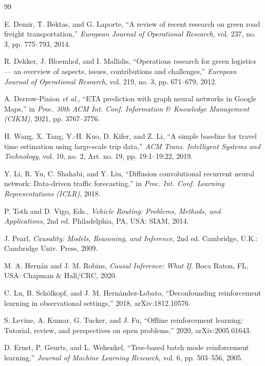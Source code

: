 \documentclass[a4paper,conference]{IEEEtran}
\begin{document}
\begin{thebibliography}{99}

 E. Demir, T. Bektas, and G. Laporte, ``A review of recent research on green road freight transportation,'' \emph{European Journal of Operational Research}, vol. 237, no. 3, pp. 775--793, 2014.

 R. Dekker, J. Bloemhof, and I. Mallidis, ``Operations research for green logistics --- an overview of aspects, issues, contributions and challenges,'' \emph{European Journal of Operational Research}, vol. 219, no. 3, pp. 671--679, 2012.

 A. Derrow-Pinion \emph{et al.}, ``ETA prediction with graph neural networks in Google Maps,'' in \emph{Proc. 30th ACM Int. Conf. Information \& Knowledge Management (CIKM)}, 2021, pp. 3767--3776.

 H. Wang, X. Tang, Y.-H. Kuo, D. Kifer, and Z. Li, ``A simple baseline for travel time estimation using large-scale trip data,'' \emph{ACM Trans. Intelligent Systems and Technology}, vol. 10, no. 2, Art. no. 19, pp. 19:1--19:22, 2019.

 Y. Li, R. Yu, C. Shahabi, and Y. Liu, ``Diffusion convolutional recurrent neural network: Data-driven traffic forecasting,'' in \emph{Proc. Int. Conf. Learning Representations (ICLR)}, 2018.

 P. Toth and D. Vigo, Eds., \emph{Vehicle Routing: Problems, Methods, and Applications}, 2nd ed. Philadelphia, PA, USA: SIAM, 2014.

 J. Pearl, \emph{Causality: Models, Reasoning, and Inference}, 2nd ed. Cambridge, U.K.: Cambridge Univ. Press, 2009.

 M. A. Hern\'an and J. M. Robins, \emph{Causal Inference: What If}. Boca Raton, FL, USA: Chapman \& Hall/CRC, 2020.

 C. Lu, B. Sch\"olkopf, and J. M. Hern\'andez-Lobato, ``Deconfounding reinforcement learning in observational settings,'' 2018, arXiv:1812.10576.

 S. Levine, A. Kumar, G. Tucker, and J. Fu, ``Offline reinforcement learning: Tutorial, review, and perspectives on open problems,'' 2020, arXiv:2005.01643.

 D. Ernst, P. Geurts, and L. Wehenkel, ``Tree-based batch mode reinforcement learning,'' \emph{Journal of Machine Learning Research}, vol. 6, pp. 503--556, 2005.


\end{thebibliography}
\end{document}
